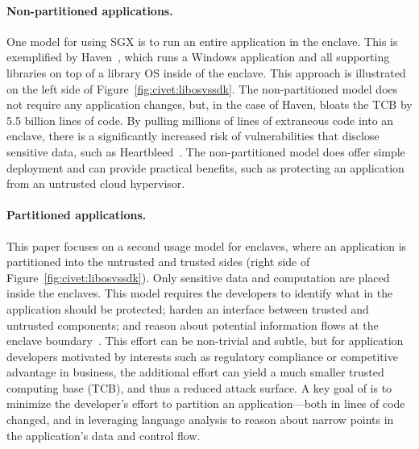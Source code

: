 \paragraph{Non-partitioned applications.}
One model for using SGX is to run an entire application in the enclave.
This is exemplified by Haven~\citep{baumann14haven}, which runs a Windows application and all supporting libraries
on top of a library OS inside of the enclave.  This approach is illustrated on the left side of Figure~\ref{fig:civet:libosvssdk}.
The non-partitioned model does not require any application changes, but, in the case of Haven, bloats the TCB by 5.5 billion lines of code.
By pulling millions of lines of extraneous code into an enclave, there is a significantly increased risk 
of vulnerabilities that disclose
sensitive data, such as Heartbleed~\citep{heartbleed}.
The non-partitioned model does offer simple deployment and can provide practical benefits, 
such as protecting an application from an untrusted cloud hypervisor.

\paragraph{Partitioned applications.}
This paper focuses on a second usage model for enclaves, where an application is partitioned into
the untrusted and trusted sides (right side of Figure~\ref{fig:civet:libosvssdk}).
Only sensitive data and computation are placed inside the enclaves.
This model requires the developers to
identify what in the application should be protected; harden an interface between trusted and untrusted components; 
and reason about potential information flows at the enclave boundary~\citep{kilpatrick2003privman}.
This effort can be non-trivial and subtle, but for application developers motivated by interests such as 
regulatory compliance or competitive advantage in business, the additional effort can yield a much smaller trusted computing
base (TCB), and thus a reduced attack surface.
A key goal of \sysname{} is to minimize the developer's effort to partition an application---both in lines of 
code changed, and in leveraging language analysis to reason about narrow points in the application's data and control flow.

